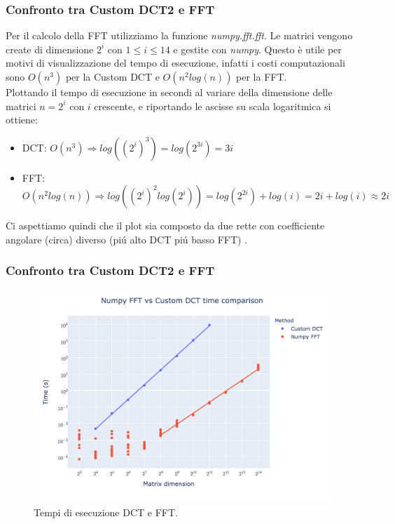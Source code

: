 \documentclass{beamer}
\begin{document}
\begin{frame}
	\frametitle{Confronto tra Custom DCT2 e FFT}
	Per il calcolo della FFT utilizziamo la funzione \textit{numpy.fft.fft}. Le matrici vengono create di dimensione $2^i$ con $1\leq i \leq 14$ e gestite con \textit{numpy}. Questo è utile per motivi di visualizzazione del tempo di esecuzione, infatti i costi computazionali sono $O(n^3)$ per la Custom DCT e $O(n^2log(n))$ per la FFT.\\
	Plottando il tempo di esecuzione in secondi al variare della dimensione delle matrici $n = 2^i$ con $i$ crescente, e riportando le ascisse su scala logaritmica si ottiene:\\
	\begin{itemize}
		\item DCT: $O(n^3) \Rightarrow log((2^i)^3) =  log(2^{3i}) = 3i $
		\item FFT: $O(n^2log(n)) \Rightarrow log((2^i)^2 log(2^i)) =  log(2^{2i}) + log(i) = 2i + log(i) \approx 2i$
	\end{itemize}
	Ci aspettiamo quindi che il plot sia composto da due rette con coefficiente angolare (circa) diverso (pi\'u alto DCT pi\'u basso FFT) .
\end{frame}


\begin{frame}
\frametitle{Confronto tra Custom DCT2 e FFT}

	\begin{figure}
		\includegraphics[width=1\textheight]{assets/dct2.png}
		\caption{Tempi di esecuzione DCT e FFT.}
		\label{fig:dct2}
	\end{figure}

\end{frame}
\end{document}
